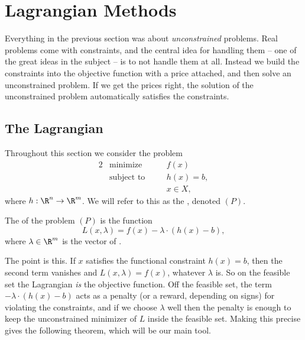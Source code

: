 \section{Lagrangian Methods}

Everything in the previous section was about \emph{unconstrained} problems. Real problems come with constraints, and the central idea for handling them -- one of the great ideas in the subject -- is to not handle them at all. Instead we build the constraints into the objective function with a price attached, and then solve an unconstrained problem. If we get the prices right, the solution of the unconstrained problem automatically satisfies the constraints.

\subsection{The Lagrangian}

Throughout this section we consider the problem
\begin{alignat*}{2}
    & \text{minimize} \quad && f(x) \\
    & \text{subject to} \quad && h(x) = b, \\
    & && x \in X,
\end{alignat*}
where $h : \R^n \rightarrow \R^m$. We will refer to this as the , denoted $(P)$.

\begin{definition}[Lagrangian]
    The  of the problem $(P)$ is the function
    $$
    L(x, \lambda) = f(x) - \lambda \cdot (h(x) - b),
    $$
    where $\lambda \in \R^m$ is the vector of .
\end{definition}

The point is this. If $x$ satisfies the functional constraint $h(x) = b$, then the second term vanishes and $L(x, \lambda) = f(x)$, whatever $\lambda$ is. So on the feasible set the Lagrangian \emph{is} the objective function. Off the feasible set, the term $-\lambda \cdot (h(x) - b)$ acts as a penalty (or a reward, depending on signs) for violating the constraints, and if we choose $\lambda$ well then the penalty is enough to keep the unconstrained minimizer of $L$ inside the feasible set. Making this precise gives the following theorem, which will be our main tool.

